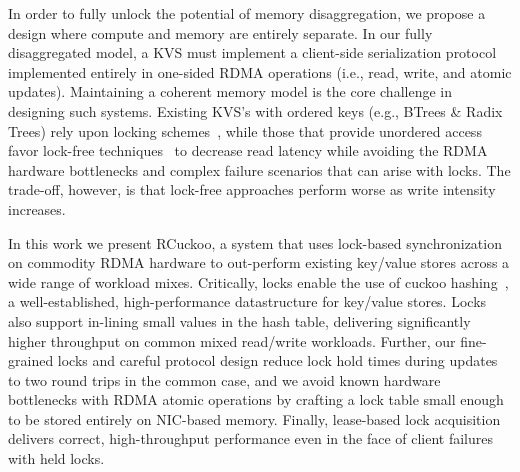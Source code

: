 In order to fully unlock the potential of memory disaggregation, we propose a
design where compute and memory are entirely separate. In our fully
disaggregated model, a KVS must implement a client-side serialization protocol
implemented entirely in one-sided RDMA operations (i.e., read, write, and atomic
updates).  Maintaining a coherent memory model is the core challenge in
designing such systems. Existing KVS's with ordered keys
(e.g., BTrees \& Radix Trees) rely upon locking schemes~\cite{smart,sherman},
while those that provide unordered access favor lock-free
techniques~\cite{rolex,ditto,fusee,clover} to decrease read latency while
avoiding the RDMA hardware bottlenecks and complex failure scenarios that can
arise with locks.  The trade-off, however, is that lock-free approaches perform
worse as write intensity increases.

In this work we present RCuckoo, a system that uses lock-based synchronization
on commodity RDMA hardware to out-perform existing key/value stores across a
wide range of workload mixes.
Critically, locks enable the use of cuckoo hashing~\cite{cuckoo}, a
well-established, high-performance datastructure for key/value stores.
Locks also support in-lining small values in the hash table,
delivering
significantly higher throughput on common mixed read/write workloads.
Further, our fine-grained locks and careful protocol design reduce
lock hold times during updates to two round trips in the common
case, and we avoid known hardware bottlenecks with RDMA atomic
operations by crafting a lock table small enough to be stored entirely
on NIC-based memory.  Finally, lease-based lock acquisition
delivers correct, high-throughput performance even in the
face of client failures with held locks.

